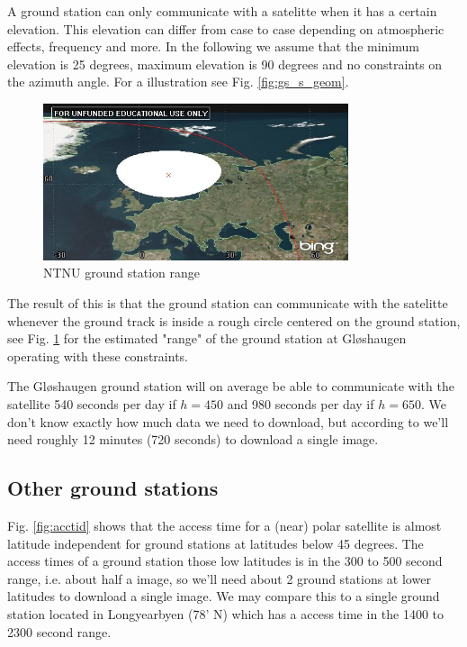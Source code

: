 A ground station can only communicate with a satelitte when it has a certain elevation. This elevation can differ from case to case depending on atmospheric effects, frequency and more. 
In the following we assume that the minimum elevation is 25 degrees, maximum elevation is 90 degrees and no constraints on the azimuth angle.  For a illustration see Fig. \ref{fig:gs_s_geom}.

\begin{figure}
  \begin{center}
    \includegraphics[width=0.8\textwidth]{Figures/ntnu_footprint}
  \end{center}
  \caption[ntnu footprint]{NTNU ground station range}
  \label{fig:ntnu_range}
\end{figure}

The result of this is that the ground station can communicate with the satelitte whenever the ground track is inside a rough circle centered on the ground station, see Fig. \ref{fig:ntnu_range} for the estimated "range" of the ground station at Gløshaugen operating with these constraints.

The Gløshaugen ground station will on average be able to communicate with the satellite 540 seconds per day if $h=450$ and 980 seconds per day if $h=650$. We don't know exactly how much data we need to download, but according to \cite{eks-kom} we'll need roughly 12 minutes (720 seconds) to download a single image. 

\subsection{Other ground stations}
Fig. \ref{fig:acctid} shows that the access time for a (near) polar satellite is almost latitude independent for ground stations at latitudes below 45 degrees. The access times of a ground station those low latitudes is in the 300 to 500 second range, i.e. about half a image, so we'll need about 2 ground stations at lower latitudes to download a single image. We may compare this to a single ground station located in Longyearbyen (78' N) which has a access time in the 1400 to 2300 second range. 
